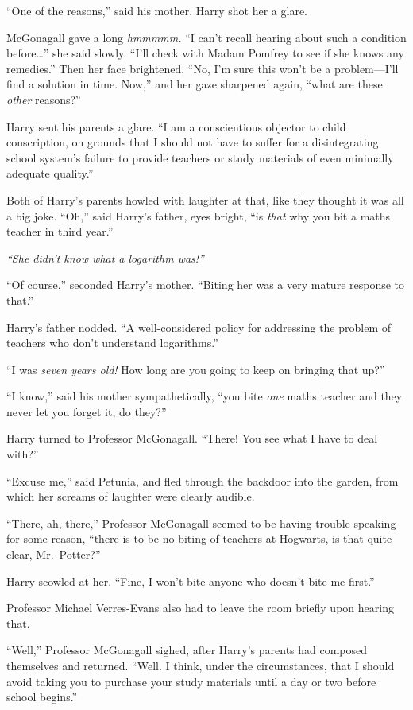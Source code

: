 ``One of the reasons,'' said his mother. Harry shot her a glare.

McGonagall gave a long \emph{hmmmmm.} ``I can't recall hearing about
such a condition before\ldots{}'' she said slowly. ``I'll check with
Madam Pomfrey to see if she knows any remedies.'' Then her face
brightened. ``No, I'm sure this won't be a problem---I'll find a
solution in time. Now,'' and her gaze sharpened again, ``what are these
\emph{other} reasons?''

Harry sent his parents a glare. ``I am a conscientious objector to child
conscription, on grounds that I should not have to suffer for a
disintegrating school system's failure to provide teachers or study
materials of even minimally adequate quality.''

Both of Harry's parents howled with laughter at that, like they thought
it was all a big joke. ``Oh,'' said Harry's father, eyes bright, ``is
\emph{that} why you bit a maths teacher in third year.''

\emph{``She didn't know what a logarithm was!''}

``Of course,'' seconded Harry's mother. ``Biting her was a very mature
response to that.''

Harry's father nodded. ``A well-considered policy for addressing the
problem of teachers who don't understand logarithms.''

``I was \emph{seven years old!} How long are you going to keep on
bringing that up?''

``I know,'' said his mother sympathetically, ``you bite \emph{one} maths
teacher and they never let you forget it, do they?''

Harry turned to Professor McGonagall. ``There! You see what I have to
deal with?''

``Excuse me,'' said Petunia, and fled through the backdoor into the
garden, from which her screams of laughter were clearly audible.

``There, ah, there,'' Professor McGonagall seemed to be having trouble
speaking for some reason, ``there is to be no biting of teachers at
Hogwarts, is that quite clear, Mr.~Potter?''

Harry scowled at her. ``Fine, I won't bite anyone who doesn't bite me
first.''

Professor Michael Verres-Evans also had to leave the room briefly upon
hearing that.

``Well,'' Professor McGonagall sighed, after Harry's parents had
composed themselves and returned. ``Well. I think, under the
circumstances, that I should avoid taking you to purchase your study
materials until a day or two before school begins.''

